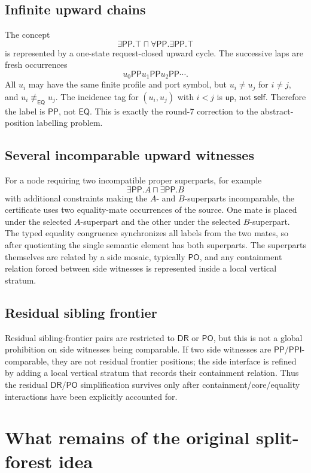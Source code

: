 \documentclass[11pt]{article}
\newcommand{\EQ}{\mathsf{EQ}}
\newcommand{\PP}{\mathsf{PP}}
\newcommand{\PPI}{\mathsf{PPI}}
\newcommand{\PO}{\mathsf{PO}}
\newcommand{\DR}{\mathsf{DR}}
\newcommand{\eqc}{\equiv_{\EQ}}
\newcommand{\self}{\mathsf{self}}
\newcommand{\up}{\mathsf{up}}
\begin{document}
\subsection{Infinite upward chains}
The concept
\[
  \exists\PP.\top\sqcap\forall\PP.\exists\PP.\top
\]
is represented by a one-state request-closed upward cycle.  The successive laps are fresh occurrences
\[
  u_0\PP u_1\PP u_2\PP\cdots.
\]
All \(u_i\) may have the same finite profile and port symbol, but \(u_i\ne u_j\) for \(i\ne j\), and \(u_i\not\eqc u_j\).  The incidence tag for \((u_i,u_j)\) with \(i<j\) is \(\up\), not \(\self\).  Therefore the label is \(\PP\), not \(\EQ\).  This is exactly the round-7 correction to the abstract-position labelling problem.

\subsection{Several incomparable upward witnesses}
For a node requiring two incompatible proper superparts, for example
\[
\exists\PP.A\sqcap\exists\PP.B
\]
with additional constraints making the \(A\)- and \(B\)-superparts incomparable, the certificate uses two equality-mate occurrences of the source.  One mate is placed under the selected \(A\)-superpart and the other under the selected \(B\)-superpart.  The typed equality congruence synchronizes all labels from the two mates, so after quotienting the single semantic element has both superparts.  The superparts themselves are related by a side mosaic, typically \(\PO\), and any containment relation forced between side witnesses is represented inside a local vertical stratum.

\subsection{Residual sibling frontier}
Residual sibling-frontier pairs are restricted to \(\DR\) or \(\PO\), but this is not a global prohibition on side witnesses being comparable.  If two side witnesses are \(\PP/\PPI\)-comparable, they are not residual frontier positions; the side interface is refined by adding a local vertical stratum that records their containment relation.  Thus the residual \(\DR/\PO\) simplification survives only after containment/core/equality interactions have been explicitly accounted for.

\section{What remains of the original split-forest idea}
\end{document}
